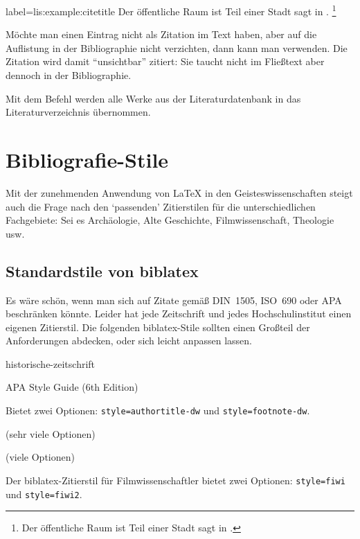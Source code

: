 \begin{lfgwexample}{label={lis:example:citetitle}}
Der öffentliche Raum ist Teil einer Stadt sagt \citeauthor{Osland2016} in .
\footnote{Der öffentliche Raum ist Teil einer Stadt sagt \citeauthor{Osland2016} in .}
\end{lfgwexample}


Möchte man einen Eintrag nicht als Zitation im Text haben, 
aber auf die Auflistung in der Bibliographie nicht verzichten,
dann kann man  verwenden.
Die Zitation wird damit \enquote{unsichtbar} zitiert:
Sie taucht nicht im Fließtext aber dennoch in der Bibliographie.

Mit dem Befehl \marg{*} werden alle Werke aus der
Literaturdatenbank in das Literaturverzeichnis übernommen.


\section{Bibliografie-Stile}\label{sec:bibliografiestile}
Mit der zunehmenden Anwendung von \LaTeX{} in den Geisteswissenschaften steigt auch die Frage nach den \enquote*{passenden} Zitierstilen für die unterschiedlichen Fachgebiete:
Sei es Archäologie, Alte Geschichte, Filmwissenschaft, Theologie usw.
\subsection{Standardstile von biblatex}

Es wäre schön, wenn man sich auf Zitate gemäß DIN~1505, ISO~690 oder APA beschränken könnte.
Leider hat jede Zeitschrift und jedes Hochschulinstitut einen eigenen Zitierstil.
Die folgenden biblatex-Stile sollten einen Großteil der Anforderungen abdecken, oder sich leicht anpassen lassen.

\begin{labeling}{historische-zeitschrift}
  \item[apa] APA Style Guide (6th Edition)
  \item[biblatex-dw] Bietet zwei Optionen: \lstinline/style=authortitle-dw/ und \lstinline/style=footnote-dw/.
  \item[archaeologie] (sehr viele Optionen)
  \item[geschichtsfrkl] (viele Optionen)
  \item[historische-zeitschrift]
  \item[historian]
  \item[arthistory-bonn]
  \item[biblatex-fiwi] Der biblatex-Zitierstil für Filmwissenschaftler bietet zwei Optionen: \lstinline/style=fiwi/ und \lstinline/style=fiwi2/.
\end{labeling}

